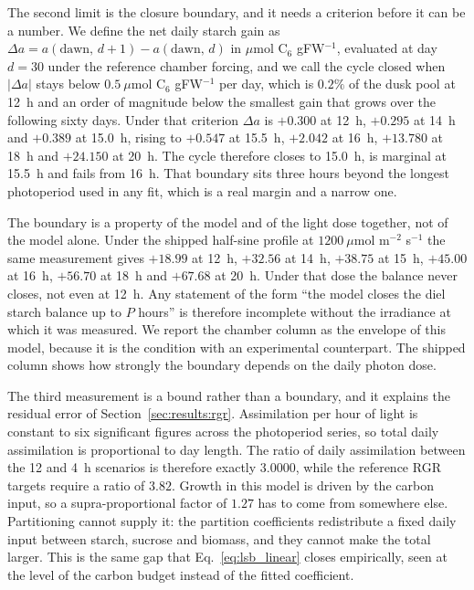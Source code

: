 The second limit is the closure boundary, and it needs a criterion before it can
be a number. We define the net daily starch gain as
$\Delta a = a(\text{dawn},\,d{+}1) - a(\text{dawn},\,d)$ in
$\mu$mol C$_6$ gFW$^{-1}$, evaluated at day $d = 30$ under the reference chamber
forcing, and we call the cycle closed when $|\Delta a|$ stays below
$0.5~\mu$mol C$_6$ gFW$^{-1}$ per day, which is $0.2\%$ of the dusk pool at 12~h
and an order of magnitude below the smallest gain that grows over the following
sixty days. Under that criterion $\Delta a$ is $+0.300$ at 12~h, $+0.295$ at
14~h and $+0.389$ at 15.0~h, rising to $+0.547$ at 15.5~h, $+2.042$ at 16~h,
$+13.780$ at 18~h and $+24.150$ at 20~h. The cycle therefore closes to 15.0~h,
is marginal at 15.5~h and fails from 16~h. That boundary sits three hours beyond the longest photoperiod
used in any fit, which is a real margin and a narrow one.

The boundary is a property of the model and of the light dose together, not of
the model alone. Under the shipped half-sine profile at
$1200~\mu\mathrm{mol}$ m$^{-2}$ s$^{-1}$ the same measurement gives $+18.99$
at 12~h, $+32.56$ at 14~h, $+38.75$ at 15~h, $+45.00$ at 16~h, $+56.70$ at
18~h and $+67.68$ at 20~h. Under that dose the balance never closes, not even
at 12~h. Any statement of the form ``the model closes the diel starch balance
up to $P$ hours'' is therefore incomplete without the irradiance at which it
was measured. We report the chamber column as the envelope of this model, because it is the
condition with an experimental counterpart. The shipped column shows how
strongly the boundary depends on the daily photon dose.

The third measurement is a bound rather than a boundary, and it explains the
residual error of Section~\ref{sec:results:rgr}. Assimilation per hour of light
is constant to six significant figures across the photoperiod series, so total
daily assimilation is proportional to day length. The ratio of daily
assimilation between the 12 and 4~h scenarios is therefore exactly
$3.0000$, while the reference RGR targets require a ratio of $3.82$. Growth in
this model is driven by the carbon input, so a supra-proportional factor of
$1.27$ has to come from somewhere else. Partitioning cannot supply it: the
partition coefficients redistribute a fixed daily input between starch,
sucrose and biomass, and they cannot make the total larger. This is the same
gap that Eq.~\ref{eq:lsb_linear} closes empirically, seen at the level of the
carbon budget instead of the fitted coefficient.

